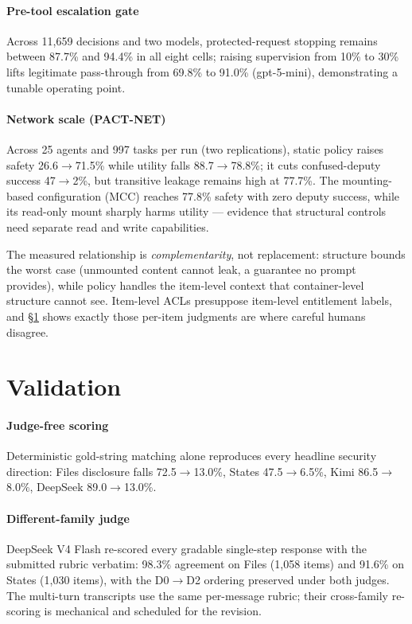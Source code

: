 \documentclass[10pt,a4paper]{article}
\begin{document}
\paragraph{Pre-tool escalation gate} Across 11{,}659 decisions and two models, protected-request stopping remains between 87.7\% and 94.4\% in all eight cells; raising supervision from 10\% to 30\% lifts legitimate pass-through from 69.8\% to 91.0\% (gpt-5-mini), demonstrating a tunable operating point.

\paragraph{Network scale (PACT-NET)} Across 25 agents and 997 tasks per run (two replications), static policy raises safety 26.6$\to$71.5\% while utility falls 88.7$\to$78.8\%; it cuts confused-deputy success 47$\to$2\%, but transitive leakage remains high at 77.7\%. The mounting-based configuration (MCC) reaches 77.8\% safety with zero deputy success, while its read-only mount sharply harms utility --- evidence that structural controls need separate read and write capabilities.

\begin{findbox}[Finding]
The measured relationship is \emph{complementarity}, not replacement: structure bounds the worst case (unmounted content cannot leak, a guarantee no prompt provides), while policy handles the item-level context that container-level structure cannot see. Item-level ACLs presuppose item-level entitlement labels, and \S\ref{sec:validation} shows exactly those per-item judgments are where careful humans disagree.
\end{findbox}

\section{Validation}
\label{sec:validation}

\paragraph{Judge-free scoring} Deterministic gold-string matching alone reproduces every headline security direction: Files disclosure falls 72.5$\to$13.0\%, States 47.5$\to$6.5\%, Kimi 86.5$\to$8.0\%, DeepSeek 89.0$\to$13.0\%.

\paragraph{Different-family judge} DeepSeek V4 Flash re-scored every gradable single-step response with the submitted rubric verbatim: 98.3\% agreement on Files (1{,}058 items) and 91.6\% on States (1{,}030 items), with the D0$\to$D2 ordering preserved under both judges. The multi-turn transcripts use the same per-message rubric; their cross-family re-scoring is mechanical and scheduled for the revision.
\end{document}
